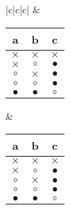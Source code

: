 \begin{longtable}{|c|c|c|}
	 &
          \begin{minipage}[t]{.3\linewidth}
          {\replicatorNodeNamedabc}
          \newline
      \begin{tabular}{|c|c|c|}
		\hline
			a &  b & c \\
		\hline
			$\times$ & $\times$  & $\times$\\ 
		\hline
			$\times$ & $\circ$  & $\bullet$\\ 
		\hline
			$\circ$ & $\times$  & $\bullet$\\ 
		\hline
			$\circ$ & $\circ$  & $\bullet$\\ 
		\hline
			$\bullet$ & $\bullet$  & $\circ$\\ 
		\hline
	\end{tabular}
	\end{minipage}&
       \begin{minipage}[t]{.3\linewidth}
        {\routerNodeabc}
        \newline
        \centering    
        \begin{tabular}{|c|c|c|}
		\hline
			a &  b & c\\
		\hline
			$\times$ & $\times$  & $\times$\\ 
		\hline
			$\times$ & $\circ$  & $\bullet$\\ 
		\hline
			$\circ$ & $\times$  & $\bullet$\\ 
		\hline
			$\circ$ & $\circ$  & $\bullet$\\ 
		\hline
			$\bullet$ & $\bullet$  & $\circ$\\ 
		\hline
	\end{tabular}
				         \vspace{.1cm}
    \end{minipage}    
 \\ \hline
\end{longtable}


